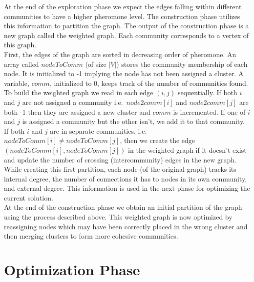 \begin{spacing}{1.5}
At the end of the exploration phase we expect the edges falling within different communities to have a higher pheromone level. The construction phase utilizes this information to partition the graph. The output of the construction phase is a new graph called the weighted graph. Each community corresponds to a vertex of this graph.\\
\indent First, the edges of the graph are sorted in decreasing order of pheromone. An array called $nodeToComm$ (of size $|V|$) stores the community membership of each node. It is initialized to -1 implying the node has not been assigned a cluster. A variable, $comm$, initialized to 0, keeps track of the number of communities found. \\
\indent To build the weighted graph we read in each edge $(i, j)$ sequentially. If both $i$ and $j$ are not assigned a community i.e.\ $node2comm[i]$ and $node2comm[j]$ are both -1 then they are assigned a new cluster and $comm$ is incremented. If one of $i$ and $j$ is assigned a community but the other isn't, we add it to that community. If both $i$ and $j$ are in separate communities, i.e.\ $nodeToComm[i] \neq nodeToComm[j]$, then we create the edge $(nodeToComm[i], nodeToComm[j])$ in the weighted graph if it doesn't exist and update the number of crossing (intercommunity) edges in the new graph.\\
\indent While creating this first partition, each node (of the original graph) tracks its internal degree, the number of connections it has to nodes in its own community, and external degree. This information is used in the next phase for optimizing the current solution. \\
\indent At the end of the construction phase we obtain an initial partition of the graph using the process described above. This weighted graph is now optimized by reassigning nodes which may have been correctly placed in the wrong cluster and then merging clusters to form more cohesive communities.\\

\section{Optimization Phase}


\end{spacing}
